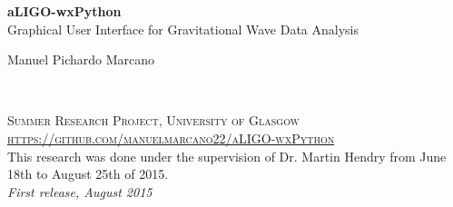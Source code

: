\documentclass[11pt,fleqn]{book} %
\begin{document}

\begingroup
\thispagestyle{empty}

\centering
\vspace*{7cm}
\par\normalfont\fontsize{35}{35}\sffamily\selectfont
\textbf{aLIGO-wxPython}\\
{\LARGE Graphical User Interface for Gravitational Wave Data Analysis}\par %
\vspace*{1cm}
{\Huge Manuel Pichardo Marcano}\par %
\endgroup


\newpage
~\vfill
\thispagestyle{empty}


\noindent \textsc{Summer Research Project, University of Glasgow}\\

\noindent \textsc{\href{https://github.com/manuelmarcano22/aLIGO-wxPython}{https://github.com/manuelmarcano22/aLIGO-wxPython  }  }\\ %

\noindent This research was done under the supervision of Dr. Martin Hendry from June 18th to August 25th of 2015.\\ %

\noindent \textit{First release, August 2015} %



\pagestyle{empty} %

\tableofcontents %
\end{document}
